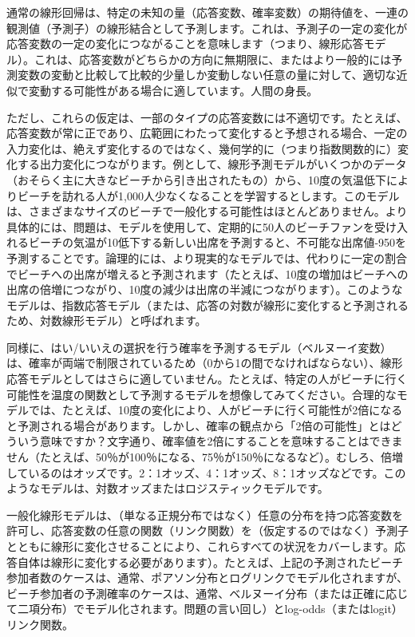 \documentclass[a4j,11pt,mc, twocolumn]{jreport}
\begin{document}
通常の線形回帰は、特定の未知の量（応答変数、確率変数）の期待値を、一連の観測値（予測子）の線形結合として予測します。これは、予測子の一定の変化が応答変数の一定の変化につながることを意味します（つまり、線形応答モデル）。これは、応答変数がどちらかの方向に無期限に、またはより一般的には予測変数の変動と比較して比較的少量しか変動しない任意の量に対して、適切な近似で変動する可能性がある場合に適しています。人間の身長。

ただし、これらの仮定は、一部のタイプの応答変数には不適切です。たとえば、応答変数が常に正であり、広範囲にわたって変化すると予想される場合、一定の入力変化は、絶えず変化するのではなく、幾何学的に（つまり指数関数的に）変化する出力変化につながります。例として、線形予測モデルがいくつかのデータ（おそらく主に大きなビーチから引き出されたもの）から、10度の気温低下によりビーチを訪れる人が1,000人少なくなることを学習するとします。このモデルは、さまざまなサイズのビーチで一般化する可能性はほとんどありません。より具体的には、問題は、モデルを使用して、定期的に50人のビーチファンを受け入れるビーチの気温が10低下する新しい出席を予測すると、不可能な出席値-950を予測することです。論理的には、より現実的なモデルでは、代わりに一定の割合でビーチへの出席が増えると予測されます（たとえば、10度の増加はビーチへの出席の倍増につながり、10度の減少は出席の半減につながります）。このようなモデルは、指数応答モデル（または、応答の対数が線形に変化すると予測されるため、対数線形モデル）と呼ばれます。





同様に、はい/いいえの選択を行う確率を予測するモデル（ベルヌーイ変数）は、確率が両端で制限されているため（0から1の間でなければならない）、線形応答モデルとしてはさらに適していません。たとえば、特定の人がビーチに行く可能性を温度の関数として予測するモデルを想像してみてください。合理的なモデルでは、たとえば、10度の変化により、人がビーチに行く可能性が2倍になると予測される場合があります。しかし、確率の観点から「2倍の可能性」とはどういう意味ですか？文字通り、確率値を2倍にすることを意味することはできません（たとえば、50％が100％になる、75％が150％になるなど）。むしろ、倍増しているのはオッズです。2：1オッズ、4：1オッズ、8：1オッズなどです。このようなモデルは、対数オッズまたはロジスティックモデルです。

一般化線形モデルは、（単なる正規分布ではなく）任意の分布を持つ応答変数を許可し、応答変数の任意の関数（リンク関数）を（仮定するのではなく）予測子とともに線形に変化させることにより、これらすべての状況をカバーします。応答自体は線形に変化する必要があります）。たとえば、上記の予測されたビーチ参加者数のケースは、通常、ポアソン分布とログリンクでモデル化されますが、ビーチ参加者の予測確率のケースは、通常、ベルヌーイ分布（または正確に応じて二項分布）でモデル化されます。問題の言い回し）とlog-odds（またはlogit）リンク関数。
\end{document}
